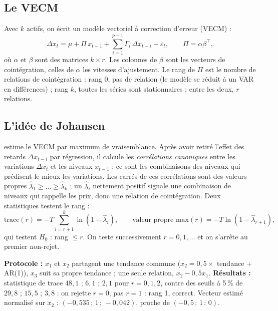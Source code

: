 \subsection{Le VECM}

Avec $k$ actifs, on écrit un modèle vectoriel à correction d'erreur (VECM) :
\[
\Delta x_t = \mu + \Pi\,x_{t-1} + \sum_{i=1}^{p-1}\Gamma_i\,\Delta x_{t-i} + \varepsilon_t, \qquad \Pi = \alpha\beta^\top,
\]
où $\alpha$ et $\beta$ sont des matrices $k\times r$. Les colonnes de $\beta$ sont les vecteurs de cointégration, celles de $\alpha$ les vitesses d'ajustement. Le rang de $\Pi$ est le nombre de relations de cointégration : rang 0, pas de relation (le modèle se réduit à un VAR en différences) ; rang $k$, toutes les séries sont stationnaires ; entre les deux, $r$ relations.

\subsection{L'idée de Johansen}

\citet{johansen1991} estime le VECM par maximum de vraisemblance. Après avoir retiré l'effet des retards $\Delta x_{t-i}$ par régression, il calcule les \emph{corrélations canoniques} entre les variations $\Delta x_t$ et les niveaux $x_{t-1}$ : ce sont les combinaisons des niveaux qui prédisent le mieux les variations. Les carrés de ces corrélations sont des valeurs propres $\hat\lambda_1 \ge \dots \ge \hat\lambda_k$ ; un $\hat\lambda_i$ nettement positif signale une combinaison de niveaux qui \og rappelle\fg{} les prix, donc une relation de cointégration. Deux statistiques testent le rang :
\[
\text{trace}(r) = -T\sum_{i=r+1}^{k}\ln(1-\hat\lambda_i), \qquad \text{valeur propre max}(r) = -T\ln(1-\hat\lambda_{r+1}),
\]
qui testent $H_0$ : rang $\le r$. On teste successivement $r = 0, 1, \dots$ et on s'arrête au premier non-rejet.

\begin{codebox}
\textbf{Protocole :} $x_1$ et $x_2$ partagent une tendance commune ($x_2 = 0{,}5\times$ tendance $+$ AR(1)), $x_3$ suit sa propre tendance ; une seule relation, $x_2 - 0{,}5x_1$. \textbf{Résultats :} statistique de trace $48{,}1$ ; $6{,}1$ ; $2{,}1$ pour $r = 0, 1, 2$, contre des seuils à 5\,\% de $29{,}8$ ; $15{,}5$ ; $3{,}8$ : on rejette $r = 0$, pas $r = 1$ : rang 1, correct. Vecteur estimé normalisé sur $x_2$ : $(-0{,}535\,;\,1\,;\,-0{,}042)$, proche de $(-0{,}5\,;\,1\,;\,0)$.
\end{codebox}

